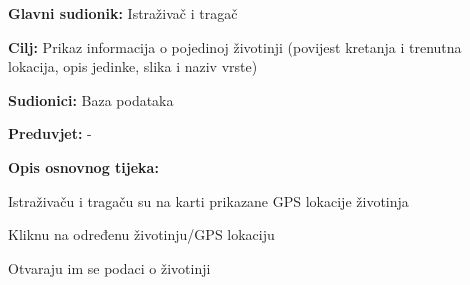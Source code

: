 					\noindent {}
					\begin{packed_item}
						
						\item \textbf{Glavni sudionik: }Istraživač i tragač
						\item  \textbf{Cilj:} Prikaz informacija o pojedinoj životinji (povijest kretanja i trenutna lokacija, opis jedinke, slika i naziv vrste)
						\item  \textbf{Sudionici:} Baza podataka
						\item  \textbf{Preduvjet:} -
						\item  \textbf{Opis osnovnog tijeka:}
						
						\item[] \begin{packed_enum}
							
							\item Istraživaču i tragaču su na karti prikazane GPS lokacije životinja
							\item Kliknu na određenu životinju/GPS lokaciju 
							\item Otvaraju im se podaci o životinji
						\end{packed_enum}
						
					\end{packed_item}
					
